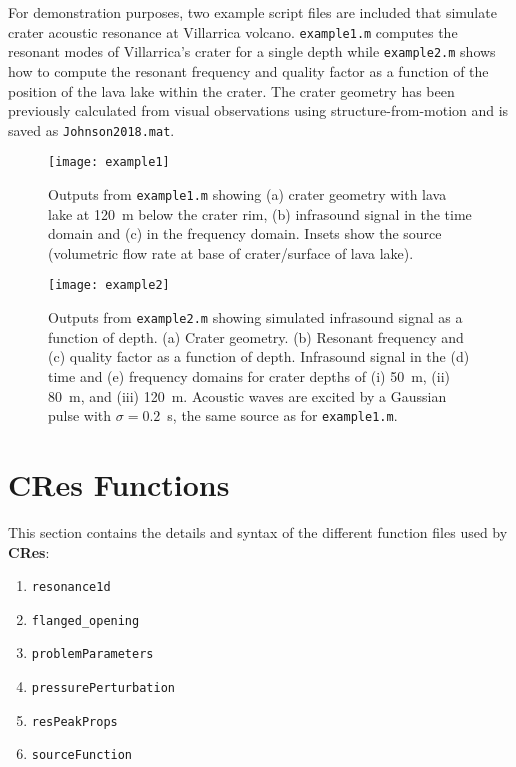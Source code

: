 \documentclass[10pt]{article}
\begin{document}
For demonstration purposes, two example script files are included that simulate crater acoustic resonance at Villarrica volcano. \texttt{example1.m} computes the resonant modes of Villarrica's crater for a single depth while \texttt{example2.m} shows how to compute the resonant frequency and quality factor as a function of the position of the lava lake within the crater. The crater geometry has been previously calculated from visual observations using structure-from-motion \citep{Johnson2018} and is saved as \texttt{Johnson2018.mat}.

\begin{figure}[h!]
\centering
\texttt{[image: example1]}
\caption{Outputs from \texttt{example1.m} showing (a) crater geometry with lava lake at 120~m below the crater rim, (b) infrasound signal in the time domain and (c) in the frequency domain. Insets show the source (volumetric flow rate at base of crater/surface of lava lake).}
\end{figure}

\begin{figure}[h!]
\centering
\texttt{[image: example2]}
\caption{Outputs from \texttt{example2.m} showing simulated infrasound signal as a function of depth. (a) Crater geometry. (b) Resonant frequency and (c) quality factor as a function of depth. Infrasound signal in the (d) time and (e) frequency domains for crater depths of (i) 50~m, (ii) 80~m, and (iii) 120~m. Acoustic waves are excited by a Gaussian pulse with $\sigma=0.2$~s, the same source as for \texttt{example1.m}.}
\end{figure}


\newpage
\section{{\bf CRes} Functions}
This section contains the details and syntax of the different function files used by {\bf CRes}:
\begin{enumerate}[label=\roman*]
\item \texttt{resonance1d}
\item \texttt{flanged\_opening}
\item \texttt{problemParameters}
\item \texttt{pressurePerturbation}
\item \texttt{resPeakProps}
\item \texttt{sourceFunction}
\end{enumerate}
\end{document}
